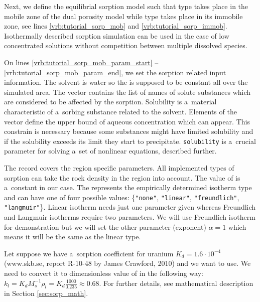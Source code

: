 Next, we define the equilibrial sorption model such that  type takes place in the mobile 
zone of the dual porosity model while  type takes place in its immobile zone, see lines \ref{vrb:tutorial_sorp_mob} and \ref{vrb:tutorial_sorp_immob}.
Isothermally described sorption simulation can be used in the case of low concentrated solutions without competition between multiple dissolved species.

On lines \ref{vrb:tutorial_sorp_mob_param_start} -- \ref{vrb:tutorial_sorp_mob_param_end}, we set the sorption related input information. The solvent is water so the  
is supposed to be constant all over the simulated area. The vector  
contains the list of names of solute substances which are considered to be affected by the sorption.
Solubility is a~material characteristic of a~sorbing substance related to the solvent. Elements of the vector 
 define the upper bound of aqueous concentration which can appear.
This constrain is necessary because some substances might have limited solubility and if the solubility exceeds 
its limit they start to precipitate. {\tt solubility} is a~crucial parameter for solving a~set of nonlinear 
equations, described further. 

The record  covers the region specific parameters.
All implemented types of sorption can take the rock density in the region into account. The value of 
 is a~constant in our case. 
The  represents the empirically determined isotherm 
type and can have one of four possible values: \{{\tt"none"}, {\tt"linear"}, {\tt"freundlich"}, {\tt"langmuir"}\}. 
Linear isotherm needs just one parameter given whereas Freundlich and Langmuir isotherms require two parameters. 
We will use Freundlich isotherm for demonstration but we will set the other parameter (exponent) $\alpha=1$ 
which means it will be the same as the linear type. 

Let suppose we have a~sorption coefficient for uranium $K_d=1.6\cdot10^{-4}$  (www.skb.se, report R-10-48 by James Crawford, 2010) 
and we want to use. We need to convert it to dimensionless value of 
in the following way: $k_l = K_dM_s^{-1}\rho_l = K_d\frac{1000}{0.235}\approx0.68$. For further details, see 
mathematical description in Section \ref{sec:sorp_math}. 

